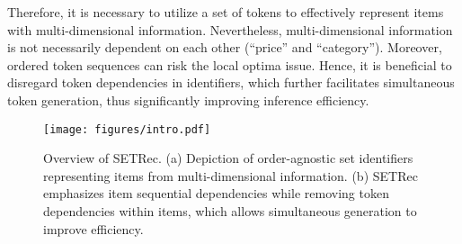 Therefore, it is necessary to utilize a set of tokens to effectively represent items with multi-dimensional information.
Nevertheless, 
multi-dimensional information is not necessarily dependent on each other (\eg ``price'' and ``category''). 
Moreover, ordered token sequences can risk the local optima issue. 
Hence, it is beneficial to disregard token dependencies in identifiers, which further facilitates simultaneous token generation, thus significantly improving inference efficiency. 




\begin{figure}[t]
\setlength{\abovecaptionskip}{0.02cm}
\setlength{\belowcaptionskip}{-0.3cm}
\centering
\texttt{[image: figures/intro.pdf]}
\caption{Overview of SETRec. (a) Depiction of order-agnostic set identifiers representing items from multi-dimensional information. (b) SETRec emphasizes item sequential dependencies while removing token dependencies within items, which allows simultaneous generation to improve efficiency.}
\label{fig:intro}
\end{figure}

